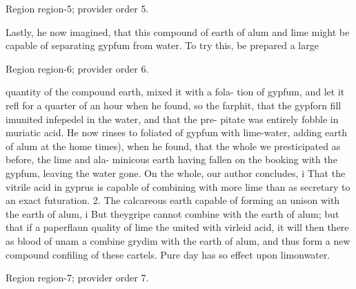\documentclass[11pt]{article}
\begin{document}
{\scriptsize\color{gray} Region region-5; provider order 5.\par}
\medskip

Lastly, he now imagined, that this compound of earth of alum and lime might be capable of separating gypfum from water. To try this, be prepared a large
\par

{\scriptsize\color{gray} Region region-6; provider order 6.\par}
\medskip

quantity of the compound earth, mixed it with a fola- tion of gypfum, and let it refl for a quarter of an hour when he found, so the farphit, that the gypforn fill imunited infepedel in the water, and that the pre- pitate was entirely fobble in muriatic acid. He now rinses to foliated of gypfum with lime-water, adding earth of alum at the home times), when he found, that the whole we presticipated as before, the lime and ala- minicous earth having fallen on the booking with the gypfum, leaving the water gone. On the whole, our author concludes, i That the vitrile acid in gyprus is capable of combining with more lime than as secretary to an exact futuration. 2. The calcareous earth capable of forming an unison with the earth of alum, i But theygripe cannot combine with the earth of alum; but that if a paperflaun quality of lime the united with virleid acid, it will then there as blood of unam a combine grydim with the earth of alum, and thus form a new compound confiling of these cartels. Pure day has so effect upon limonwater.
\par

{\scriptsize\color{gray} Region region-7; provider order 7.\par}
\medskip
\end{document}
